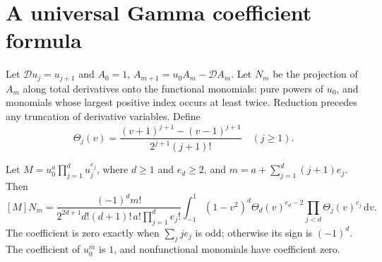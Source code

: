\section{A universal Gamma coefficient formula}
\label{ubg:integration:section}

Let $\mathcal D u_j=u_{j+1}$ and
$A_0=1$, $A_{m+1}=u_0A_m-\mathcal D A_m$.
Let $N_m$ be the projection of $A_m$ along total derivatives onto the
functional monomials: pure powers of $u_0$, and monomials whose largest
positive index occurs at least twice. Reduction precedes any truncation
of derivative variables. Define
\[
 \Theta_j(v)=\frac{(v+1)^{j+1}-(v-1)^{j+1}}
                  {2^{j+1}(j+1)!}\quad(j\ge1).
\]

\begin{theorem}
\label{ubg:integration:theorem}
Let $M=u_0^a\prod_{j=1}^d u_j^{e_j}$, where $d\ge1$ and $e_d\ge2$, and
$m=a+\sum_{j=1}^d(j+1)e_j$. Then
\[
 [M]N_m=\frac{(-1)^dm!}
 {2^{2d+1}d!(d+1)!\,a!\prod_{j=1}^d e_j!}
 \int_{-1}^1(1-v^2)^d\Theta_d(v)^{e_d-2}
                       \prod_{j<d}\Theta_j(v)^{e_j}\,\mathrm dv.
\]
The coefficient is zero exactly when $\sum_jje_j$ is odd; otherwise
its sign is $(-1)^d$. The coefficient of $u_0^m$ is $1$, and nonfunctional
monomials have coefficient zero.
\end{theorem}

